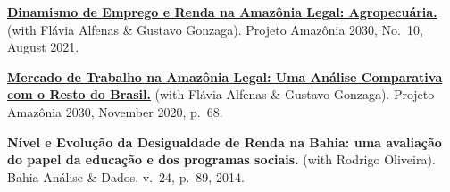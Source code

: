 \documentclass[a4paper,9pt]{article}
\newcommand{\cvgap}{\vspace{2mm}}
\begin{document}
\begin{flushleft}
\cvgap

\textbf{\href{https://amazonia2030.org.br/dinamismo-de-emprego-e-renda-na-amazonia-legal-agropecuaria/}{Dinamismo de Emprego e Renda na Amazônia Legal: Agropecuária.}} (with Flávia Alfenas \& Gustavo Gonzaga). Projeto Amazônia 2030, No.~10, August 2021.

\cvgap

\textbf{\href{https://amazonia2030.org.br/mercado-de-trabalho-na-amazonia-legal-uma-analise-comparativa-com-o-resto-do-brasil/}{Mercado de Trabalho na Amazônia Legal: Uma Análise Comparativa com o Resto do Brasil.}} (with Flávia Alfenas \& Gustavo Gonzaga). Projeto Amazônia 2030, November 2020, p.~68.

\cvgap

\textbf{Nível e Evolução da Desigualdade de Renda na Bahia: uma avaliação do papel da educação e dos programas sociais.} (with Rodrigo Oliveira). Bahia Análise \& Dados, v.~24, p.~89, 2014.

\end{flushleft}
\end{document}
